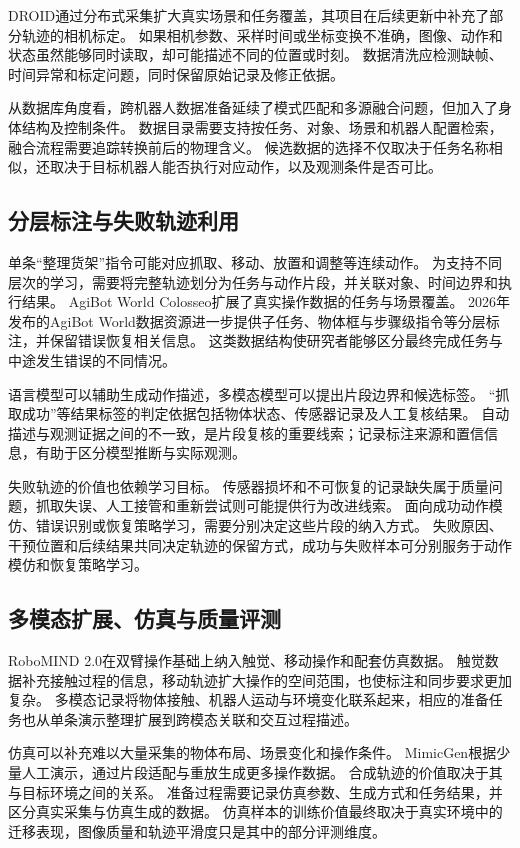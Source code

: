 DROID通过分布式采集扩大真实场景和任务覆盖，其项目在后续更新中补充了部分轨迹的相机标定。\cite{droid}
如果相机参数、采样时间或坐标变换不准确，图像、动作和状态虽然能够同时读取，却可能描述不同的位置或时刻。
数据清洗应检测缺帧、时间异常和标定问题，同时保留原始记录及修正依据。

从数据库角度看，跨机器人数据准备延续了模式匹配和多源融合问题，但加入了身体结构及控制条件。
数据目录需要支持按任务、对象、场景和机器人配置检索，融合流程需要追踪转换前后的物理含义。
候选数据的选择不仅取决于任务名称相似，还取决于目标机器人能否执行对应动作，以及观测条件是否可比。

\subsection{分层标注与失败轨迹利用}

单条“整理货架”指令可能对应抓取、移动、放置和调整等连续动作。
为支持不同层次的学习，需要将完整轨迹划分为任务与动作片段，并关联对象、时间边界和执行结果。
AgiBot World Colosseo扩展了真实操作数据的任务与场景覆盖。\cite{agibot}
2026年发布的AgiBot World数据资源进一步提供子任务、物体框与步骤级指令等分层标注，并保留错误恢复相关信息。\cite{agibot2026,agibot2026_release}
这类数据结构使研究者能够区分最终完成任务与中途发生错误的不同情况。

语言模型可以辅助生成动作描述，多模态模型可以提出片段边界和候选标签。
“抓取成功”等结果标签的判定依据包括物体状态、传感器记录及人工复核结果。
自动描述与观测证据之间的不一致，是片段复核的重要线索；记录标注来源和置信信息，有助于区分模型推断与实际观测。

失败轨迹的价值也依赖学习目标。
传感器损坏和不可恢复的记录缺失属于质量问题，抓取失误、人工接管和重新尝试则可能提供行为改进线索。
面向成功动作模仿、错误识别或恢复策略学习，需要分别决定这些片段的纳入方式。
失败原因、干预位置和后续结果共同决定轨迹的保留方式，成功与失败样本可分别服务于动作模仿和恢复策略学习。

\subsection{多模态扩展、仿真与质量评测}

RoboMIND 2.0在双臂操作基础上纳入触觉、移动操作和配套仿真数据。\cite{robomind2}
触觉数据补充接触过程的信息，移动轨迹扩大操作的空间范围，也使标注和同步要求更加复杂。
多模态记录将物体接触、机器人运动与环境变化联系起来，相应的准备任务也从单条演示整理扩展到跨模态关联和交互过程描述。

仿真可以补充难以大量采集的物体布局、场景变化和操作条件。
MimicGen根据少量人工演示，通过片段适配与重放生成更多操作数据。\cite{mimicgen}
合成轨迹的价值取决于其与目标环境之间的关系。
准备过程需要记录仿真参数、生成方式和任务结果，并区分真实采集与仿真生成的数据。
仿真样本的训练价值最终取决于真实环境中的迁移表现，图像质量和轨迹平滑度只是其中的部分评测维度。


